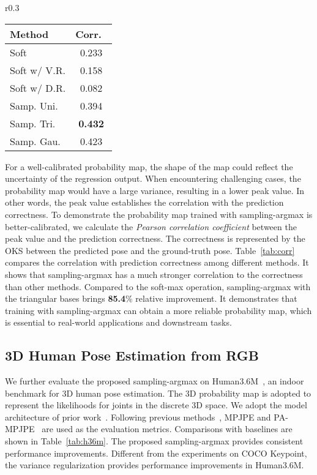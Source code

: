 \documentclass{article}
\begin{document}
\begin{wraptable}{r}{0.3\linewidth}
    \vspace{-5mm}
    \caption{Correlation testing.}
    \label{tab:corr}
    \centering
    \begin{tabular}{lc}
        \toprule
        Method & Corr.~ \\
        \midrule
        Soft & 0.233 \\
        Soft w/ V.R. & 0.158 \\
        Soft w/ D.R. & 0.082 \\
        \midrule
        Samp. Uni. & 0.394 \\
        Samp. Tri. & \textbf{0.432} \\
        Samp. Gau. & 0.423 \\
        \bottomrule
    \end{tabular}
\end{wraptable}
For a well-calibrated probability map, the shape of the map could reflect the uncertainty of the regression output. When encountering challenging cases, the probability map would have a large variance, resulting in a lower peak value. In other words, the peak value establishes the correlation with the prediction correctness. To demonstrate the probability map trained with sampling-argmax is better-calibrated, we calculate the \textit{Pearson correlation coefficient} between the peak value and the prediction correctness. The correctness is represented by the OKS between the predicted pose and the ground-truth pose. Table~\ref{tab:corr} compares the correlation with prediction correctness among different methods. It shows that sampling-argmax has a much stronger correlation to the correctness than other methods. Compared to the soft-max operation, sampling-argmax with the triangular bases brings \textbf{85.4}\% relative improvement. It demonstrates that training with sampling-argmax can obtain a more reliable probability map, which is essential to real-world applications and downstream tasks.







\subsection{3D Human Pose Estimation from RGB}
We further evaluate the proposed sampling-argmax on Human3.6M~\cite{h36m}, an indoor benchmark for 3D human pose estimation. The 3D probability map is adopted to represent the likelihoods for joints in the discrete 3D space. We adopt the model architecture of prior work~\cite{integral}. Following previous methods~\cite{coarse,integral,moon,li2021human}, MPJPE and PA-MPJPE~\cite{gpa} are used as the evaluation metrics. Comparisons with baselines are shown in Table~\ref{tab:h36m}. The proposed sampling-argmax provides consistent performance improvements. Different from the experiments on COCO Keypoint, the variance regularization provides performance improvements in Human3.6M.
\end{document}
